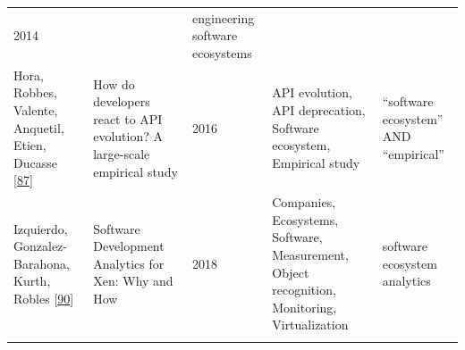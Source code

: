\documentclass[]{book}
\begin{document}
\begin{longtable}[]{@{}lllll@{}}
\begin{minipage}[t]{0.02\columnwidth}
2014\strut
\end{minipage} & \begin{minipage}[t]{0.34\columnwidth}\raggedright\strut
\strut
\end{minipage} & \begin{minipage}[t]{0.13\columnwidth}\raggedright\strut
engineering software ecosystems\strut
\end{minipage}\tabularnewline
\begin{minipage}[t]{0.05\columnwidth}\raggedright\strut
Hora, Robbes, Valente, Anquetil, Etien, Ducasse
{[}\protect\hyperlink{ref-Hora2016}{87}{]}\strut
\end{minipage} & \begin{minipage}[t]{0.31\columnwidth}\raggedright\strut
How do developers react to API evolution? A large-scale empirical
study\strut
\end{minipage} & \begin{minipage}[t]{0.02\columnwidth}\raggedright\strut
2016\strut
\end{minipage} & \begin{minipage}[t]{0.34\columnwidth}\raggedright\strut
API evolution, API deprecation, Software ecosystem, Empirical
study\strut
\end{minipage} & \begin{minipage}[t]{0.13\columnwidth}\raggedright\strut
``software ecosystem'' AND ``empirical''\strut
\end{minipage}\tabularnewline
\begin{minipage}[t]{0.05\columnwidth}\raggedright\strut
Izquierdo, Gonzalez-Barahona, Kurth, Robles
{[}\protect\hyperlink{ref-Izquierdo2018}{90}{]}\strut
\end{minipage} & \begin{minipage}[t]{0.31\columnwidth}\raggedright\strut
Software Development Analytics for Xen: Why and How\strut
\end{minipage} & \begin{minipage}[t]{0.02\columnwidth}\raggedright\strut
2018\strut
\end{minipage} & \begin{minipage}[t]{0.34\columnwidth}\raggedright\strut
Companies, Ecosystems, Software, Measurement, Object recognition,
Monitoring, Virtualization\strut
\end{minipage} & \begin{minipage}[t]{0.13\columnwidth}\raggedright\strut
software ecosystem analytics\strut
\end{minipage}\tabularnewline
\begin{minipage}[t]{0.05\columnwidth}\raggedright\strut

\end{minipage}
\end{longtable}
\end{document}
